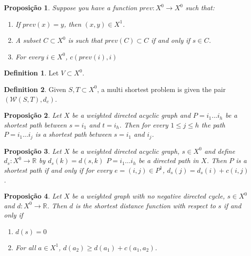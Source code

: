 \documentclass[]{article}
\newtheorem{proposition}{Proposição}[section]
\theoremstyle{definition}
\newtheorem{definition}{Definition}[section]
\theoremstyle{definition}
\newcommand{\raw}{\rightarrow}
\newcommand{\bb}{\mathbb}
\begin{document}
\begin{proposition}
	Suppose you have a function $prev: X^0 \raw X^0$ such that:
	
	\begin{enumerate}
		
		\item If $prev(x) = y$, then $(x, y) \in X^1$.
		
		\item A subset $C \subset X^0$ is such that $prev(C) \subset C$ if and only if $s \in C$.
		
		\item For every $i \in X^0$, $c(prev(i), i)$
		
	\end{enumerate}
\end{proposition}

\begin{definition}
	Let $V \subset X^0$.
\end{definition}


\begin{definition}
	Given $S, T \subset X^0$, a multi shortest problem is given the pair $(\mathcal{W}(S, T), d_c)$.
\end{definition}


\begin{proposition}

	Let $X$ be a weighted directed acyclic graph and $P = i_{1}...i_{h}$ be a shortest path between $s = i_1$ and $t = i_h$. Then for every $ 1 \leq j \leq h$  the path $P = i_{1}...i_{j}$ is a shortest path between $s = i_1$ and $i_j$.

\end{proposition}

\begin{proposition}
	Let $X$ be a weighted directed acyclic graph, $s \in X^0$ and define $d_s: X^0 \raw \bb{R}$ by $d_s(k) = d(s, k)$  $P = i_{1}...i_{h}$ be a directed path in $X$. Then $P$ is a shortest path if and only if for every $e = (i, j) \in P^1$, $d_s(j) = d_s(i) + c(i, j)$.  
\end{proposition}

\begin{proposition}
	Let $X$ be a weighted graph with no negative directed cycle, $s \in X^0$ and $d: X^0 \raw \bb{R}$. Then $d$ is the shortest distance function with respect to $s$ if and only if 
\begin{enumerate}
	\item $d(s) = 0$
	
	\item For all $a \in X^1$, $d(a_2) \geq d(a_1) + c(a_1, a_2)$. 
\end{enumerate}	

\end{proposition}
\end{document}

